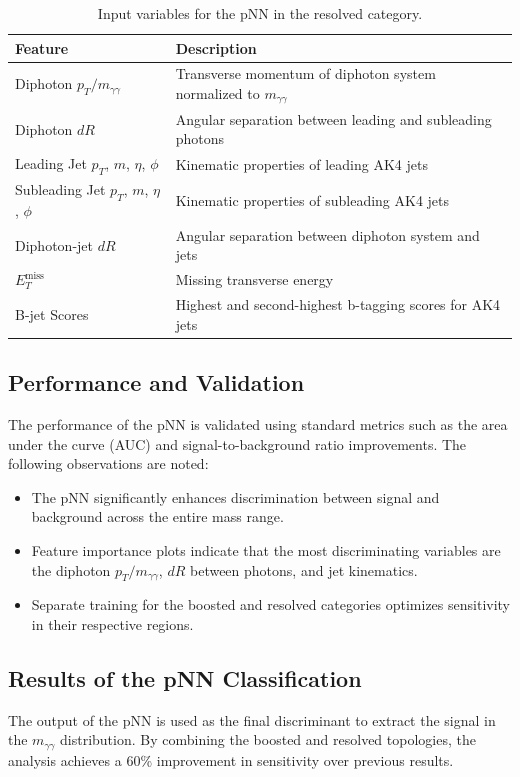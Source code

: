 \begin{table}[h!]
    \centering
    \caption{Input variables for the pNN in the resolved category.}
    \label{tab:pnn_resolved_inputs}
    \begin{tabular}{ll}
        \hline
        \textbf{Feature} & \textbf{Description} \\
        \hline
        Diphoton \(p_T/m_{\gamma\gamma}\) & Transverse momentum of diphoton system normalized to \(m_{\gamma\gamma}\) \\
        Diphoton \(dR\) & Angular separation between leading and subleading photons \\
        Leading Jet \(p_T\), \(m\), \(\eta\), \(\phi\) & Kinematic properties of leading AK4 jets \\
        Subleading Jet \(p_T\), \(m\), \(\eta\), \(\phi\) & Kinematic properties of subleading AK4 jets \\
        Diphoton-jet \(dR\) & Angular separation between diphoton system and jets \\
        \(E_T^{\text{miss}}\) & Missing transverse energy \\
        B-jet Scores & Highest and second-highest b-tagging scores for AK4 jets \\
        \hline
    \end{tabular}
\end{table}

\subsection{Performance and Validation}
The performance of the pNN is validated using standard metrics such as the area under the curve (AUC) and signal-to-background ratio improvements. The following observations are noted:
\begin{itemize}
    \item The pNN significantly enhances discrimination between signal and background across the entire mass range.
    \item Feature importance plots indicate that the most discriminating variables are the diphoton \(p_T/m_{\gamma\gamma}\), \(dR\) between photons, and jet kinematics.
    \item Separate training for the boosted and resolved categories optimizes sensitivity in their respective regions.
\end{itemize}

\subsection{Results of the pNN Classification}
The output of the pNN is used as the final discriminant to extract the signal in the \(m_{\gamma\gamma}\) distribution. By combining the boosted and resolved topologies, the analysis achieves a 60\% improvement in sensitivity over previous results.

